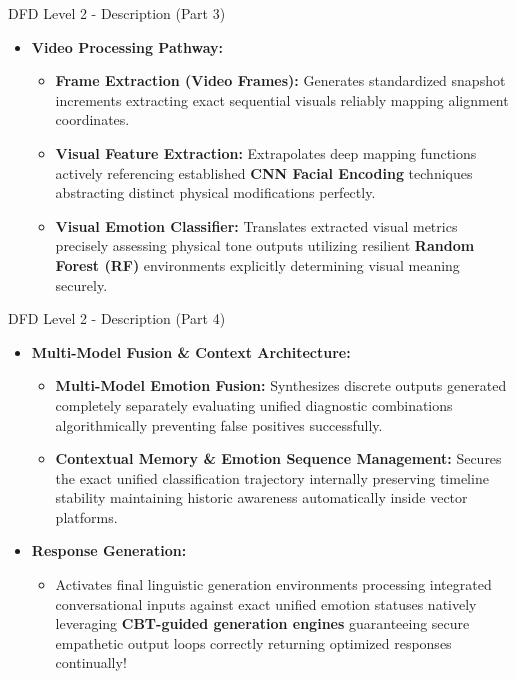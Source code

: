 \documentclass[11pt]{beamer}
\begin{document}
\begin{frame}{DFD Level 2 - Description (Part 3)}
\begin{itemize}
    \item \textbf{Video Processing Pathway:}
    \begin{itemize}
        \item \textbf{Frame Extraction (Video Frames):} Generates standardized snapshot increments extracting exact sequential visuals reliably mapping alignment coordinates.
        \item \textbf{Visual Feature Extraction:} Extrapolates deep mapping functions actively referencing established \textbf{CNN Facial Encoding} techniques abstracting distinct physical modifications perfectly.
        \item \textbf{Visual Emotion Classifier:} Translates extracted visual metrics precisely assessing physical tone outputs utilizing resilient \textbf{Random Forest (RF)} environments explicitly determining visual meaning securely.
    \end{itemize}
\end{itemize}
\end{frame}

\begin{frame}{DFD Level 2 - Description (Part 4)}
\begin{itemize}
    \item \textbf{Multi-Model Fusion \& Context Architecture:}
    \begin{itemize}
        \item \textbf{Multi-Model Emotion Fusion:} Synthesizes discrete outputs generated completely separately evaluating unified diagnostic combinations algorithmically preventing false positives successfully.
        \item \textbf{Contextual Memory \& Emotion Sequence Management:} Secures the exact unified classification trajectory internally preserving timeline stability maintaining historic awareness automatically inside vector platforms.
    \end{itemize}
    
    \vspace{0.3cm}
    \item \textbf{Response Generation:}
    \begin{itemize}
        \item Activates final linguistic generation environments processing integrated conversational inputs against exact unified emotion statuses natively leveraging \textbf{CBT-guided generation engines} guaranteeing secure empathetic output loops correctly returning optimized responses continually!
    \end{itemize}
\end{itemize}
\end{frame}
\end{document}
